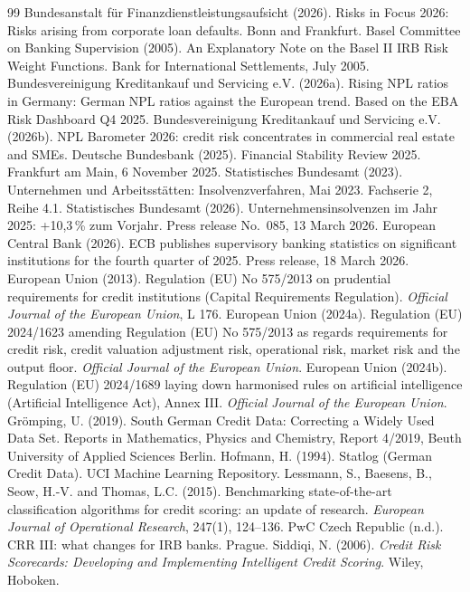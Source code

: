 \documentclass[11pt,a4paper]{article}
\begin{document}
\renewcommand{\refname}{References}
\begin{thebibliography}{99}\small\setlength{\itemsep}{2pt}
 Bundesanstalt für Finanzdienstleistungsaufsicht (2026). Risks in Focus 2026: Risks arising from corporate loan defaults. Bonn and Frankfurt.
 Basel Committee on Banking Supervision (2005). An Explanatory Note on the Basel II IRB Risk Weight Functions. Bank for International Settlements, July 2005.
 Bundesvereinigung Kreditankauf und Servicing e.V. (2026a). Rising NPL ratios in Germany: German NPL ratios against the European trend. Based on the EBA Risk Dashboard Q4 2025.
 Bundesvereinigung Kreditankauf und Servicing e.V. (2026b). NPL Barometer 2026: credit risk concentrates in commercial real estate and SMEs.
 Deutsche Bundesbank (2025). Financial Stability Review 2025. Frankfurt am Main, 6 November 2025.
 Statistisches Bundesamt (2023). Unternehmen und Arbeitsstätten: Insolvenzverfahren, Mai 2023. Fachserie 2, Reihe 4.1.
 Statistisches Bundesamt (2026). Unternehmensinsolvenzen im Jahr 2025: +10,3\,\% zum Vorjahr. Press release No.~085, 13 March 2026.
 European Central Bank (2026). ECB publishes supervisory banking statistics on significant institutions for the fourth quarter of 2025. Press release, 18 March 2026.
 European Union (2013). Regulation (EU) No 575/2013 on prudential requirements for credit institutions (Capital Requirements Regulation). \textit{Official Journal of the European Union}, L 176.
 European Union (2024a). Regulation (EU) 2024/1623 amending Regulation (EU) No 575/2013 as regards requirements for credit risk, credit valuation adjustment risk, operational risk, market risk and the output floor. \textit{Official Journal of the European Union}.
 European Union (2024b). Regulation (EU) 2024/1689 laying down harmonised rules on artificial intelligence (Artificial Intelligence Act), Annex III. \textit{Official Journal of the European Union}.
 Grömping, U. (2019). South German Credit Data: Correcting a Widely Used Data Set. Reports in Mathematics, Physics and Chemistry, Report 4/2019, Beuth University of Applied Sciences Berlin.
 Hofmann, H. (1994). Statlog (German Credit Data). UCI Machine Learning Repository.
 Lessmann, S., Baesens, B., Seow, H.-V. and Thomas, L.C. (2015). Benchmarking state-of-the-art classification algorithms for credit scoring: an update of research. \textit{European Journal of Operational Research}, 247(1), 124--136.
 PwC Czech Republic (n.d.). CRR III: what changes for IRB banks. Prague.
 Siddiqi, N. (2006). \textit{Credit Risk Scorecards: Developing and Implementing Intelligent Credit Scoring}. Wiley, Hoboken.
\end{thebibliography}
\end{document}
